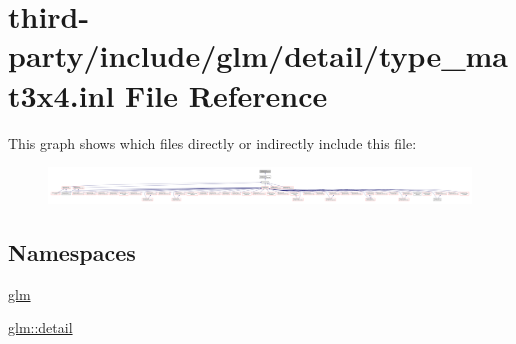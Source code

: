 \hypertarget{type__mat3x4_8inl}{}\section{third-\/party/include/glm/detail/type\+\_\+mat3x4.inl File Reference}
\label{type__mat3x4_8inl}
This graph shows which files directly or indirectly include this file\+:
\nopagebreak
\begin{figure}[H]
\begin{center}
\leavevmode
\includegraphics[width=350pt]{type__mat3x4_8inl__dep__incl}
\end{center}
\end{figure}
\subsection*{Namespaces}
\begin{DoxyCompactItemize}
\item 
 \hyperlink{namespaceglm}{glm}
\item 
 \hyperlink{namespaceglm_1_1detail}{glm\+::detail}
\end{DoxyCompactItemize}
